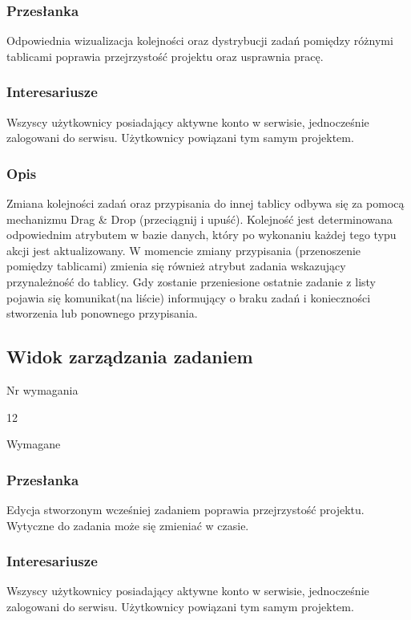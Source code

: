 \documentclass[eng,printmode]{mgr}
\begin{document}
\subsubsection{Przesłanka}
Odpowiednia wizualizacja kolejności oraz dystrybucji zadań pomiędzy różnymi tablicami poprawia przejrzystość projektu oraz usprawnia pracę.

\subsubsection{Interesariusze}
Wszyscy użytkownicy posiadający aktywne konto w serwisie, jednocześnie zalogowani do serwisu. Użytkownicy powiązani tym samym projektem.

\subsubsection{Opis}
Zmiana kolejności zadań oraz przypisania do innej tablicy odbywa się za pomocą mechanizmu Drag \& Drop (przeciągnij i upuść). Kolejność jest determinowana odpowiednim atrybutem w bazie danych, który po wykonaniu każdej tego typu akcji jest aktualizowany. W momencie zmiany przypisania (przenoszenie pomiędzy tablicami) zmienia się również atrybut zadania wskazujący przynależność do tablicy. Gdy zostanie przeniesione ostatnie zadanie z listy pojawia się komunikat(na liście) informujący o braku zadań i konieczności stworzenia lub ponownego przypisania.

\subsection{Widok zarządzania zadaniem}
\begin{labeling}{Nr wymagania}
\item [Nr wymagania:] 12
\item [Priorytet:] Wymagane
\end{labeling}
\subsubsection{Przesłanka}
Edycja stworzonym wcześniej zadaniem poprawia przejrzystość projektu. Wytyczne do zadania może się zmieniać w czasie.

\subsubsection{Interesariusze}
Wszyscy użytkownicy posiadający aktywne konto w serwisie, jednocześnie zalogowani do serwisu. Użytkownicy powiązani tym samym projektem.
\end{document}
